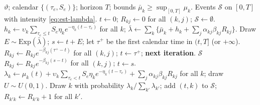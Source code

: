 \begin{algorithm}[t]
\caption{Ogata's thinning for the shock-augmented model with exponential kernels.}\label{alg:ogata}
\begin{algorithmic}[1]
\Require $\vartheta$; calendar $\{(\tau_e,S_e)\}$; horizon $T$; bounds
  $\bar\mu_k\ge\sup_{[0,T]}\mu_k$.
\Ensure Events $\mathcal S$ on $[0,T]$ with intensity \eqref{eq:est-lambda}.
\State $t\gets0$; $R_{kj}\gets0$ for all $(k,j)$; $\mathcal S\gets\emptyset$.
\Loop
  \State $h_k\gets\upsilon_k\sum_{\tau_e\le t}S_e\eta_ke^{-\eta_k(t-\tau_e)}$ for all $k$;\quad
    $\bar\lambda\gets\sum_k\{\bar\mu_k+h_k+\sum_j\alpha_{kj}\beta_{kj}R_{kj}\}$.
  \State Draw $E\sim\mathrm{Exp}(\bar\lambda)$; $s\gets t+E$; let $\tau^+$ be the first
    calendar time in $(t,T]$ (or $+\infty$).
    \State $R_{kj}\gets R_{kj}e^{-\beta_{kj}(\tau^+-t)}$ for all $(k,j)$; $t\gets\tau^+$;
      \textbf{next iteration}.
  \EndIf
   \State \Return $\mathcal S$ \EndIf
  \State $R_{kj}\gets R_{kj}e^{-\beta_{kj}(s-t)}$ for all $(k,j)$; $t\gets s$.
  \State $\lambda_k\gets\mu_k(t)+\upsilon_k\sum_{\tau_e<t}S_e\eta_ke^{-\eta_k(t-\tau_e)}
    +\sum_j\alpha_{kj}\beta_{kj}R_{kj}$ for all $k$; draw $U\sim U(0,1)$.
    \State Draw $k$ with probability $\lambda_k/\sum_{k'}\lambda_{k'}$; add $(t,k)$ to
      $\mathcal S$; $R_{k'k}\gets R_{k'k}+1$ for all $k'$.
  \EndIf
\EndLoop
\end{algorithmic}
\end{algorithm}


